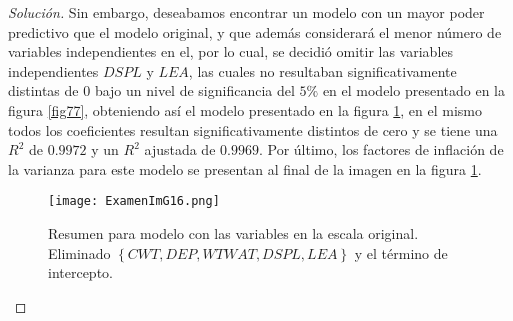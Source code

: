 \documentclass[10.5pt,notitlepage]{article}
\newenvironment{solucion}
  {\begin{proof}[Solución]}
  {\end{proof}}
\newcommand{\kis}[1]{\left\{ #1 \right\}}
\theoremstyle{plain}
\begin{document}
\begin{solucion}
Sin embargo, deseabamos encontrar un modelo con un mayor poder predictivo que el modelo original, y que además considerará el menor número de variables independientes en el, por lo cual, se decidió omitir las variables independientes \(DSPL\) y \(LEA\), las cuales no resultaban significativamente distintas de \(0\) bajo un nivel de significancia del \(5\%\) en el modelo presentado en la figura \ref{fig77}, obteniendo así el modelo presentado en la figura \ref{fig88}, en el mismo todos los coeficientes resultan significativamente distintos de cero y se tiene una \(R^2\) de \(0.9972\) y un \(R^2\) ajustada de \(0.9969\). Por último, los factores de inflación de la varianza para este modelo se presentan al final de la imagen en la figura \ref{fig88}.\\ 
\begin{figure}[htb]
 \centering
 \texttt{[image: ExamenImG16.png]}
 \caption{Resumen para modelo con las variables en la escala original. Eliminado \(\kis{CWT,DEP, WTWAT,DSPL, LEA}\) y el término de intercepto.}
\label{fig88}
\end{figure}


\end{solucion}
\end{document}
